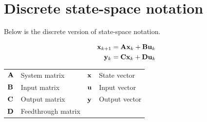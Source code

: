 \section{Discrete state-space notation}

Below is the discrete version of state-space notation.
\begin{definition}%
  \begin{align}
    \mathbf{x}_{k+1} &= \mathbf{A}\mathbf{x}_k + \mathbf{B}\mathbf{u}_k \label{eq:disc_ss_x} \\
    \mathbf{y}_k &= \mathbf{C}\mathbf{x}_k + \mathbf{D}\mathbf{u}_k \label{eq:disc_ss_y}
  \end{align}
  \begin{figurekey}
    \begin{tabular}{llll}
      $\mathbf{A}$ & System matrix      & $\mathbf{x}$ & State vector \\
      $\mathbf{B}$ & Input matrix       & $\mathbf{u}$ & Input vector \\
      $\mathbf{C}$ & Output matrix      & $\mathbf{y}$ & Output vector \\
      $\mathbf{D}$ & Feedthrough matrix &  &  \\
    \end{tabular}
  \end{figurekey}
\end{definition}
